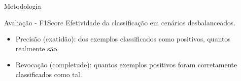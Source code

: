 \documentclass{beamer}
\begin{document}
\begin{frame}{Metodologia}
\setlength\leftmargini{1em}
\begin{block}{Avaliação - F1Score}
\justifying
Efetividade da classificação em cenários desbalanceados. 
\begin{itemize}

\item Precisão (exatidão): dos exemplos classificados como positivos, quantos realmente são.

\item Revocação (completude): quantos exemplos positivos foram corretamente classificados como tal. 
\end{itemize}

\end{block}
\end{frame}
\end{document}
